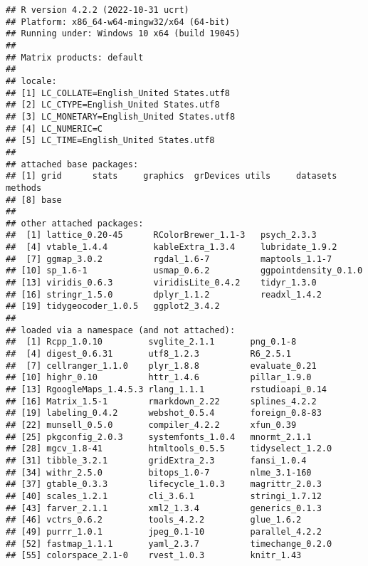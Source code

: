\documentclass[
]{article}
\begin{document}
\begin{verbatim}
## R version 4.2.2 (2022-10-31 ucrt)
## Platform: x86_64-w64-mingw32/x64 (64-bit)
## Running under: Windows 10 x64 (build 19045)
## 
## Matrix products: default
## 
## locale:
## [1] LC_COLLATE=English_United States.utf8 
## [2] LC_CTYPE=English_United States.utf8   
## [3] LC_MONETARY=English_United States.utf8
## [4] LC_NUMERIC=C                          
## [5] LC_TIME=English_United States.utf8    
## 
## attached base packages:
## [1] grid      stats     graphics  grDevices utils     datasets  methods  
## [8] base     
## 
## other attached packages:
##  [1] lattice_0.20-45      RColorBrewer_1.1-3   psych_2.3.3         
##  [4] vtable_1.4.4         kableExtra_1.3.4     lubridate_1.9.2     
##  [7] ggmap_3.0.2          rgdal_1.6-7          maptools_1.1-7      
## [10] sp_1.6-1             usmap_0.6.2          ggpointdensity_0.1.0
## [13] viridis_0.6.3        viridisLite_0.4.2    tidyr_1.3.0         
## [16] stringr_1.5.0        dplyr_1.1.2          readxl_1.4.2        
## [19] tidygeocoder_1.0.5   ggplot2_3.4.2       
## 
## loaded via a namespace (and not attached):
##  [1] Rcpp_1.0.10         svglite_2.1.1       png_0.1-8          
##  [4] digest_0.6.31       utf8_1.2.3          R6_2.5.1           
##  [7] cellranger_1.1.0    plyr_1.8.8          evaluate_0.21      
## [10] highr_0.10          httr_1.4.6          pillar_1.9.0       
## [13] RgoogleMaps_1.4.5.3 rlang_1.1.1         rstudioapi_0.14    
## [16] Matrix_1.5-1        rmarkdown_2.22      splines_4.2.2      
## [19] labeling_0.4.2      webshot_0.5.4       foreign_0.8-83     
## [22] munsell_0.5.0       compiler_4.2.2      xfun_0.39          
## [25] pkgconfig_2.0.3     systemfonts_1.0.4   mnormt_2.1.1       
## [28] mgcv_1.8-41         htmltools_0.5.5     tidyselect_1.2.0   
## [31] tibble_3.2.1        gridExtra_2.3       fansi_1.0.4        
## [34] withr_2.5.0         bitops_1.0-7        nlme_3.1-160       
## [37] gtable_0.3.3        lifecycle_1.0.3     magrittr_2.0.3     
## [40] scales_1.2.1        cli_3.6.1           stringi_1.7.12     
## [43] farver_2.1.1        xml2_1.3.4          generics_0.1.3     
## [46] vctrs_0.6.2         tools_4.2.2         glue_1.6.2         
## [49] purrr_1.0.1         jpeg_0.1-10         parallel_4.2.2     
## [52] fastmap_1.1.1       yaml_2.3.7          timechange_0.2.0   
## [55] colorspace_2.1-0    rvest_1.0.3         knitr_1.43
\end{verbatim}
\end{document}
